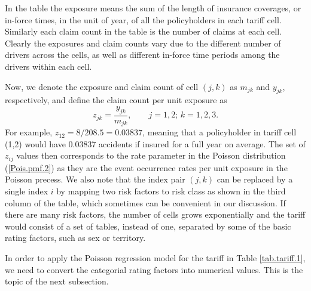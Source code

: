 \documentclass[12pt]{article}
\begin{document}
In the table the exposure means the sum of the length of insurance coverages, or in-force times, in the unit of year, of all the policyholders in each tariff cell. Similarly each claim count in the table is the number of claims at each cell. Clearly the exposures and claim counts vary due to the different number of drivers across the cells, as well as different in-force time periods among the drivers within each cell.

Now, we denote the exposure and claim count of cell $(j,k)$ as $m_{jk}$ and $y_{jk}$, respectively, and define the claim count per unit exposure as
\begin{equation}
\label{ }
z_{jk}= \frac{y_{jk}}{ m_{jk}}, \qquad j=1,2;\, k=1, 2,3.
\end{equation}
For example, $z_{12}=8/208.5=0.03837$, meaning that a policyholder in tariff cell (1,2) would have 0.03837 accidents if insured for a full year on average. The set of $z_{ij}$ values then corresponds to the rate parameter in the Poisson distribution (\ref{Pois.pmf.2}) as they are the event occurrence rates per unit exposure in the Poisson precess. We also note that the index pair $(j,k)$ can be replaced by a single index $i$ by mapping two risk factors to risk class as shown in the third column of the table, which sometimes can be convenient in our discussion. If there are many risk factors, the number of cells grows exponentially and the tariff would consist of a set of tables, instead of one, separated by some of the basic rating factors, such as sex or territory. 

In order to apply the Poisson regression model for the tariff in Table \ref{tab.tariff.1}, we need to convert the categorial rating factors   into numerical values. This is the topic of the next subsection.


\end{document}

